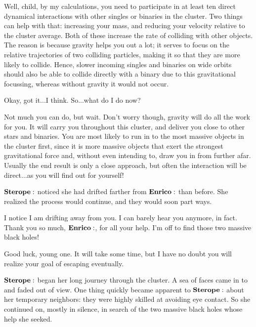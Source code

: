 \documentclass[main.tex]{subfiles}
\begin{document}
\Enrico Well, child, by my calculations, you need to participate in at least ten direct dynamical interactions with other singles or binaries in the cluster.  Two things can help with that:  increasing your mass, and reducing your velocity relative to the cluster average.  Both of these increase the rate of colliding with other objects.  The reason is because gravity helps you out a lot; it serves to focus on the relative trajectories of two colliding particles, making it so that they are more likely to collide.  Hence, slower incoming singles and binaries on wide orbits should also be able to collide directly with a binary due to this gravitational focussing, whereas without gravity it would not occur.

\Sterope Okay, got it...I think.  So...what do I do now?

\Enrico Not much you can do, but wait.  Don't worry though, gravity will do all the work for you.  It will carry you throughout this cluster, and deliver you close to other stars and binaries.  You are most likely to run in to the most massive objects in the cluster first, since it is more massive objects that exert the strongest gravitational force and, without even intending to, draw you in from further afar.  Usually the end result is only a close approach, but often the interaction will be direct...as you will find out for yourself!

$\Sterope$ noticed she had drifted farther from $\Enrico$ than before.  She realized the process would continue, and they would soon part ways.

\Sterope I notice I am drifting away from you.  I can barely hear you anymore, in fact.  Thank you so much, $\Enrico$, for all your help.  I'm off to find those two massive black holes!

\Enrico Good luck, young one.  It will take some time, but I have no doubt you will realize your goal of escaping eventually.

$\Sterope$ began her long journey through the cluster.  A sea of faces came in to and faded out of view.  One thing quickly became apparent to $\Sterope$ about her temporary neighbors:  they were highly skilled at avoiding eye contact.  So she continued on, mostly in silence, in search of the two massive black holes whose help she seeked.
\end{document}
